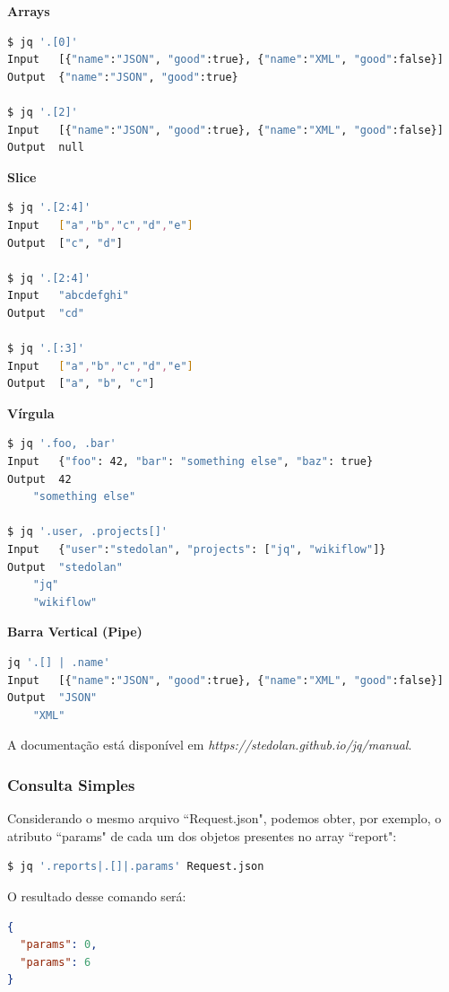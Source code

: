 \documentclass[a4paper, 12pt] {article}
\begin{document}
				\textbf{Arrays}

\begin{lstlisting}[language=bash]
$ jq '.[0]'
Input	[{"name":"JSON", "good":true}, {"name":"XML", "good":false}]
Output 	{"name":"JSON", "good":true}
	
$ jq '.[2]'
Input	[{"name":"JSON", "good":true}, {"name":"XML", "good":false}]
Output 	null
\end{lstlisting}

				\newpage \textbf{Slice}

\begin{lstlisting}[language=bash]
$ jq '.[2:4]'
Input	["a","b","c","d","e"]
Output 	["c", "d"]
	
$ jq '.[2:4]'
Input	"abcdefghi"
Output 	"cd"
	
$ jq '.[:3]'
Input	["a","b","c","d","e"]
Output 	["a", "b", "c"]
\end{lstlisting}

				\textbf{Vírgula}

\begin{lstlisting}[language=bash]
$ jq '.foo, .bar'
Input	{"foo": 42, "bar": "something else", "baz": true}
Output 	42
	"something else"
	
$ jq '.user, .projects[]'
Input	{"user":"stedolan", "projects": ["jq", "wikiflow"]}
Output 	"stedolan"
	"jq"
	"wikiflow"
\end{lstlisting}

				\textbf{Barra Vertical (Pipe)}

\begin{lstlisting}[language=bash]
jq '.[] | .name'
Input	[{"name":"JSON", "good":true}, {"name":"XML", "good":false}]
Output 	"JSON"
	"XML"
\end{lstlisting}

				A documentação está disponível em \textit{https://stedolan.github.io/jq/manual}.
			\subsubsection{Consulta Simples}
				Considerando o mesmo arquivo “Request.json", podemos obter, por exemplo, o atributo “params" de cada um dos objetos presentes no array “report":
\begin{lstlisting}[language=bash]
$ jq '.reports|.[]|.params' Request.json
\end{lstlisting}

				O resultado desse comando será:

\begin{lstlisting}[language=json,firstnumber=1]
{
  "params": 0,
  "params": 6
}
\end{lstlisting}
\end{document}
